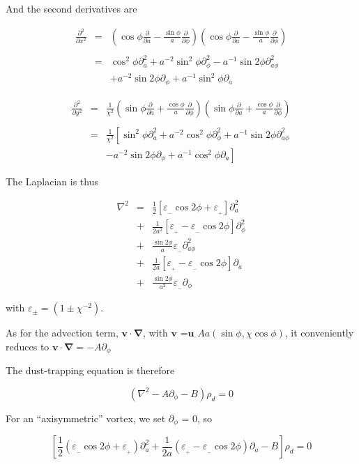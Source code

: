 \documentclass[useAMS,8pt,twocolumn]{article}
\newcommand{\pderiv}[2]{\frac{\partial #1}{\partial #2}}
\newcommand{\pderivn}[3]{\frac{\partial^{#3} #1}{\partial #2^{#3}}}
\renewcommand{\v}[1]{{\boldsymbol{#1}}} %
\newcommand{\del}{\v{\nabla}}
\newcommand{\grad}{\del}
\newcommand{\Laplace}{\nabla^2}
\newcommand{\beq}{\begin{equation}}
\newcommand{\eeq}{\end{equation}}
\newcommand{\beqn}{\begin{eqnarray}}
\newcommand{\eeqn}{\end{eqnarray}}
\newcommand{\epsp}{\varepsilon_{_{+}}}
\newcommand{\epsm}{\varepsilon_{_{-}}}
\begin{document}
And the second derivatives are 

\beqn
\pderivn{}{x}{2} &=& \left(\cos\phi \pderiv{}{a} - \frac{\sin\phi}{a}
  \pderiv{}{\phi}\right) \left(\cos\phi \pderiv{}{a} -
  \frac{\sin\phi}{a} \pderiv{}{\phi}\right) \nonumber \\ \\
&=& \cos^2\phi\partial^2_a + a^{-2}\sin^2\phi \partial^2_\phi -
a^{-1}\sin 2\phi \partial^2_{a\phi} \nonumber \\
&&+ a^{-2}\sin 2\phi\partial_\phi +
a^{-1}\sin^2\phi \partial_a 
\eeqn

\beqn
\pderivn{}{y}{2} &=& \frac{1}{\chi^2}\left(\sin\phi \pderiv{}{a} +
  \frac{\cos\phi}{a} \pderiv{}{\phi} \right) \left(\sin\phi
  \pderiv{}{a} + \frac{\cos\phi}{a} \pderiv{}{\phi} \right) \nonumber
\\ \\
&=& \frac{1}{\chi^2}\left[ \sin^2\phi \partial^2_a +
  a^{-2}\cos^2\phi \partial^2_\phi + a^{-1}\sin
  2\phi \partial^2_{a\phi}\right. \nonumber \\
&&\left.- a^{-2}\sin 2\phi \partial_\phi +
  a^{-1}\cos^2\phi \partial_a \right] 
\eeqn

The Laplacian is thus 

\beqn
\Laplace{} &= &\frac{1}{2}\left[ \epsm \cos 2\phi + \epsp\right] \partial^2_a  \\
                &+& \frac{1}{2a^2}\left[ \epsp - \epsm \cos 2\phi\right] \partial^2_\phi  \\
                &+& \frac{\sin 2\phi}{a}\epsm \partial^2_{a\phi}  \\
                &+& \frac{1}{2a}\left[ \epsp - \epsm \cos 2\phi\right] \partial_a  \\
                &+& \frac{\sin 2\phi}{a^2} \epsm\partial_\phi
\eeqn

with $\varepsilon_{\pm} = (1 \pm \chi^{-2})$. 

As for the advection term, $\v{v}\cdot\grad$, with $\v{v}$ =$\v{u}$
$Aa(\sin\phi,\chi\cos\phi)$, it conveniently reduces to  $\v{v}\cdot\grad= - A \partial_\phi $

The dust-trapping equation is therefore 

\beq
\left(\Laplace{} - A\partial_\phi - B\right) \rho_d = 0 
\eeq

For an ``axisymmetric'' vortex, we set $\partial_\phi$ = 0, so 

\beq
\left[\frac{1}{2}\left( \epsm \cos 2\phi +\epsp\right) \partial^2_a   + \frac{1}{2a}\left( \epsp - \epsm\cos 2\phi\right) \partial_a  - B\right] \rho_d = 0 
\eeq
\end{document}
